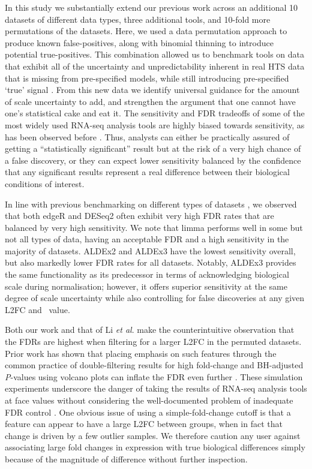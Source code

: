 \documentclass[10pt,letterpaper]{article}
\begin{document}
In this study we substantially extend our previous work across an additional 10 datasets of different data types, three additional tools, and 10-fold more permutations of the datasets. Here, we used a data permutation approach \cite{li_exaggerated_2022} to produce known false-positives, along with binomial thinning \cite{gerard_data-based_2020} to introduce potential true-positives. This combination allowed us to benchmark tools on data that exhibit all of the uncertainty and unpredictability inherent in real HTS data that is missing from pre-specified models, while still introducing pre-specified `true' signal \cite{gerard_data-based_2020}. From this new data we identify universal guidance for the amount of scale uncertainty to add, and strengthen the argument that one cannot have one's statistical cake and eat it. The sensitivity and FDR tradeoffs of some of the most widely used RNA-seq analysis tools are highly biased towards sensitivity, as has been observed before \cite{hawinkel2017, Nearing:2022aa, li_exaggerated_2022}. Thus, analysts can either be practically assured of getting a ``statistically significant'' result but at the risk of a very high chance of a false discovery, or they can expect lower sensitivity balanced by the confidence that any significant results represent a real difference between their biological conditions of interest.

In line with previous benchmarking on different types of datasets \cite{hawinkel2017, Nearing:2022aa, li_exaggerated_2022}, we observed that both edgeR and DESeq2 often exhibit very high FDR rates that are balanced by very high sensitivity. We note that limma performs well in some but not all types of data, having an acceptable FDR and a high sensitivity in the majority of datasets. ALDEx2 and ALDEx3 have the lowest sensitivity overall, but also markedly lower FDR rates for all datasets. Notably, ALDEx3 provides the same functionality as its predecessor in terms of acknowledging biological scale during normalisation; however, it offers superior sensitivity at the same degree of scale uncertainty while also controlling for false discoveries at any given L2FC and \textgamma~value.

Both our work and that of Li \textit{et al}. make the counterintuitive observation that the FDRs are highest when filtering for a larger L2FC in the permuted datasets. Prior work has shown that placing emphasis on such features through the common practice of double-filtering results for high fold-change and BH-adjusted \textit{P}-values using volcano plots can inflate the FDR even further \cite{Cui:2003aa, bourgon_independent_2010}. These simulation experiments underscore the danger of taking the results of RNA-seq analysis tools at face values without considering the well-documented problem of inadequate FDR control \cite{witten2007comparison, Zhang:2009aa}. One obvious issue of using a simple-fold-change cutoff is that a feature can appear to have a large L2FC between groups, when in fact that change is driven by a few outlier samples. We therefore caution any user against associating large fold changes in expression with true biological differences simply because of the magnitude of difference without further inspection.
\end{document}
